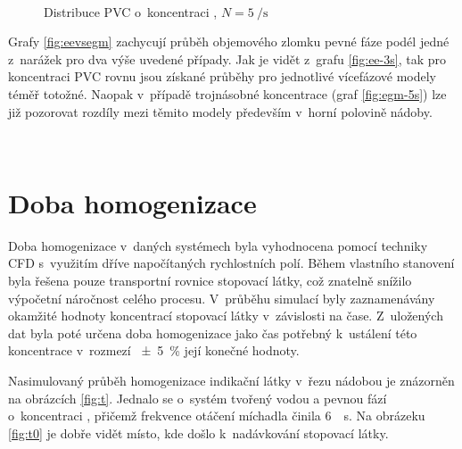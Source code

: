 \begin{figure}[h!]
 \centering
  \qquad 
  \\
  \caption{Distribuce PVC o~koncentraci , $N=\SI{5}{\per\second}$}
  \label{fig:w15}
\end{figure}


Grafy \ref{fig:eevsegm} zachycují průběh objemového zlomku pevné fáze podél jedné z~narážek pro dva výše uvedené případy. Jak je vidět z~grafu \ref{fig:ee-3s}, tak pro koncentraci PVC rovnu  jsou získané průběhy pro jednotlivé vícefázové modely téměř totožné. Naopak v~případě trojnásobné koncentrace (graf \ref{fig:egm-5s}) lze již pozorovat rozdíly mezi těmito modely především v~horní polovině nádoby. 


\begin{grf}[h!]
 \centering
  \\ 
  \caption{Průběh objemového zlomku pevné fáze, \pvpS}
  \label{fig:eevsegm}
\end{grf}
\newpage

\section{Doba homogenizace}
Doba homogenizace v~daných systémech byla vyhodnocena pomocí techniky CFD s~využitím dříve napočítaných rychlostních polí. Během vlastního stanovení byla řešena pouze transportní rovnice stopovací látky, což znatelně snížilo výpočetní náročnost celého procesu. V~průběhu simulací byly zaznamenávány okamžité hodnoty koncentrací stopovací látky v~závislosti na čase. Z~uložených dat byla poté určena doba homogenizace jako čas potřebný k~ustálení této koncentrace v~rozmezí \SI{\pm 5}{\percent} její konečné hodnoty.

Nasimulovaný průběh homogenizace indikační látky v~řezu nádobou je znázorněn na obrázcích \ref{fig:t}. Jednalo se o~systém tvořený vodou a pevnou fází o~koncentraci , přičemž frekvence otáčení míchadla činila \SI{6}{\per\second}. Na obrázeku \ref{fig:t0} je dobře vidět místo, kde došlo k~nadávkování stopovací látky.

